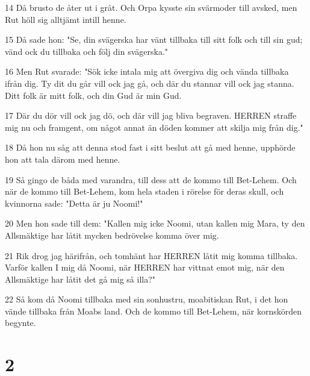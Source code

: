 \par 14 Då brusto de åter ut i gråt. Och Orpa kysste sin svärmoder till avsked, men Rut höll sig alltjämt intill henne.
\par 15 Då sade hon: "Se, din svägerska har vänt tillbaka till sitt folk och till sin gud; vänd ock du tillbaka och följ din svägerska."
\par 16 Men Rut svarade: "Sök icke intala mig att övergiva dig och vända tillbaka ifrån dig. Ty dit du går vill ock jag gå, och där du stannar vill ock jag stanna. Ditt folk är mitt folk, och din Gud är min Gud.
\par 17 Där du dör vill ock jag dö, och där vill jag bliva begraven. HERREN straffe mig nu och framgent, om något annat än döden kommer att skilja mig från dig."
\par 18 Då hon nu såg att denna stod fast i sitt beslut att gå med henne, upphörde hon att tala därom med henne.
\par 19 Så gingo de båda med varandra, till dess att de kommo till Bet-Lehem. Och när de kommo till Bet-Lehem, kom hela staden i rörelse för deras skull, och kvinnorna sade: "Detta är ju Noomi!"
\par 20 Men hon sade till dem: "Kallen mig icke Noomi, utan kallen mig Mara, ty den Allsmäktige har låtit mycken bedrövelse komma över mig.
\par 21 Rik drog jag härifrån, och tomhänt har HERREN låtit mig komma tillbaka. Varför kallen I mig då Noomi, när HERREN har vittnat emot mig, när den Allsmäktige har låtit det gå mig så illa?"
\par 22 Så kom då Noomi tillbaka med sin sonhustru, moabitiskan Rut, i det hon vände tillbaka från Moabs land. Och de kommo till Bet-Lehem, när kornskörden begynte.

\chapter{2}

